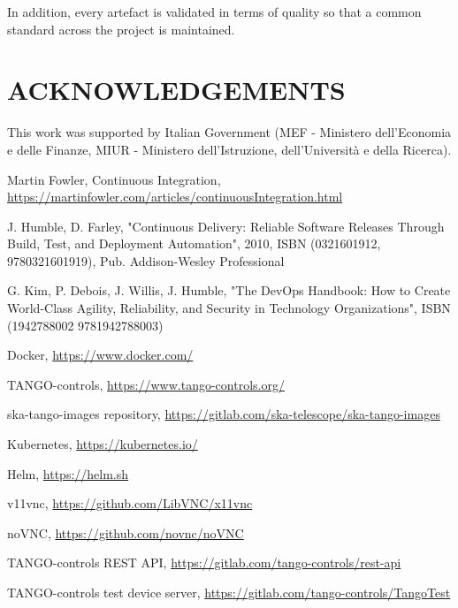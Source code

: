 \documentclass[a4paper,
	       keeplastbox,   %
	       References
	       ]{jacow}
\begin{document}
In addition, every artefact is validated in terms of quality so that a common standard across the project is maintained.

\section{ACKNOWLEDGEMENTS}
This work was supported by Italian Government (MEF - Ministero
dell'Economia e delle Finanze, MIUR - Ministero dell'Istruzione,
dell'Università e della Ricerca).

%
	{\printbibliography}%
	{%
	
	\begin{thebibliography}{99} %
	
		Martin Fowler, Continuous Integration,
		\url{https://martinfowler.com/articles/continuousIntegration.html}
	
		J. Humble, D. Farley, "Continuous Delivery: Reliable Software
			Releases Through Build, Test, and Deployment
			Automation",
		2010, ISBN (0321601912, 9780321601919), Pub. Addison-Wesley
			Professional
	
		G. Kim, P. Debois, J. Willis, J. Humble, "The DevOps Handbook:
			How to Create World-Class Agility, Reliability, and
			Security in Technology Organizations", ISBN (1942788002
			9781942788003)
	
		Docker, 
		\url{https://www.docker.com/}
	
		TANGO-controls,
		\url{https://www.tango-controls.org/}
	
		ska-tango-images repository,
		\url{https://gitlab.com/ska-telescope/ska-tango-images}
	
		Kubernetes,
		\url{https://kubernetes.io/}
	
		Helm,
		\url{https://helm.sh}
	
		v11vnc,
		\url{https://github.com/LibVNC/x11vnc}
	
		noVNC,
		\url{https://github.com/novnc/noVNC}
	
		TANGO-controls REST API,
		\url{https://gitlab.com/tango-controls/rest-api}
	
		TANGO-controls test device server,
		\url{https://gitlab.com/tango-controls/TangoTest}
	

\end{thebibliography}}
\end{document}
